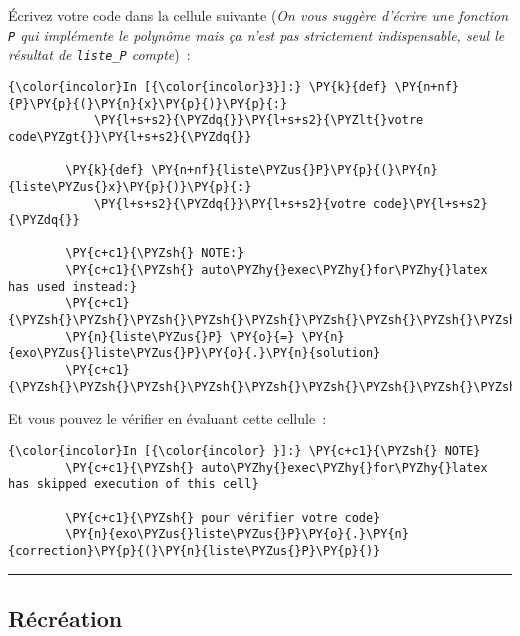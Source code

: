     Écrivez votre code dans la cellule suivante (\emph{On vous suggère
d'écrire une fonction \texttt{P} qui implémente le polynôme mais ça
n'est pas strictement indispensable, seul le résultat de
\texttt{liste\_P} compte})~:

    \begin{Verbatim}[commandchars=\\\{\},frame=single,framerule=0.3mm,rulecolor=\color{cellframecolor}]
{\color{incolor}In [{\color{incolor}3}]:} \PY{k}{def} \PY{n+nf}{P}\PY{p}{(}\PY{n}{x}\PY{p}{)}\PY{p}{:}
            \PY{l+s+s2}{\PYZdq{}}\PY{l+s+s2}{\PYZlt{}votre code\PYZgt{}}\PY{l+s+s2}{\PYZdq{}}
        
        \PY{k}{def} \PY{n+nf}{liste\PYZus{}P}\PY{p}{(}\PY{n}{liste\PYZus{}x}\PY{p}{)}\PY{p}{:}
            \PY{l+s+s2}{\PYZdq{}}\PY{l+s+s2}{votre code}\PY{l+s+s2}{\PYZdq{}}
        
        \PY{c+c1}{\PYZsh{} NOTE:}
        \PY{c+c1}{\PYZsh{} auto\PYZhy{}exec\PYZhy{}for\PYZhy{}latex has used instead:}
        \PY{c+c1}{\PYZsh{}\PYZsh{}\PYZsh{}\PYZsh{}\PYZsh{}\PYZsh{}\PYZsh{}\PYZsh{}\PYZsh{}\PYZsh{}}
        \PY{n}{liste\PYZus{}P} \PY{o}{=} \PY{n}{exo\PYZus{}liste\PYZus{}P}\PY{o}{.}\PY{n}{solution}
        \PY{c+c1}{\PYZsh{}\PYZsh{}\PYZsh{}\PYZsh{}\PYZsh{}\PYZsh{}\PYZsh{}\PYZsh{}\PYZsh{}\PYZsh{}}
\end{Verbatim}


    Et vous pouvez le vérifier en évaluant cette cellule~:

    \begin{Verbatim}[commandchars=\\\{\},frame=single,framerule=0.3mm,rulecolor=\color{cellframecolor}]
{\color{incolor}In [{\color{incolor} }]:} \PY{c+c1}{\PYZsh{} NOTE}
        \PY{c+c1}{\PYZsh{} auto\PYZhy{}exec\PYZhy{}for\PYZhy{}latex has skipped execution of this cell}
        
        \PY{c+c1}{\PYZsh{} pour vérifier votre code}
        \PY{n}{exo\PYZus{}liste\PYZus{}P}\PY{o}{.}\PY{n}{correction}\PY{p}{(}\PY{n}{liste\PYZus{}P}\PY{p}{)}
\end{Verbatim}


    \begin{center}\rule{0.5\linewidth}{\linethickness}\end{center}

    \hypertarget{ruxe9cruxe9ation}{%
\subsection{Récréation}\label{ruxe9cruxe9ation}}


